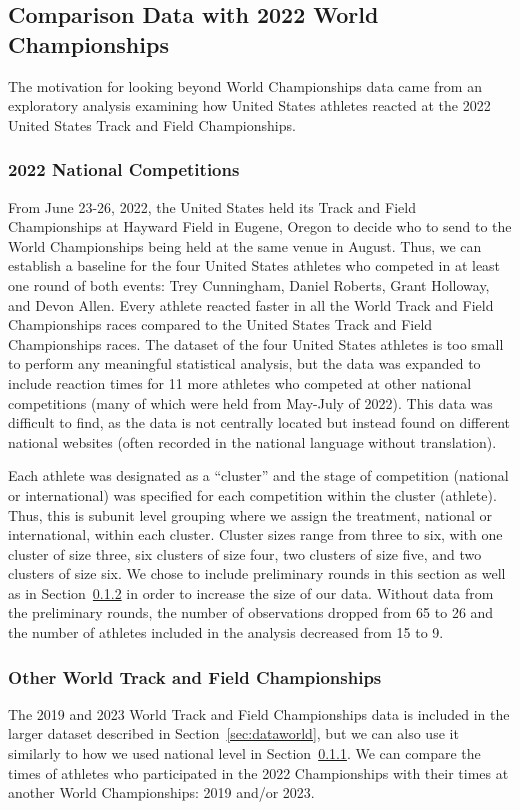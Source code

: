 \documentclass[12pt, letterpaper, titlepage]{article}
\begin{document}
\subsection{Comparison Data with 2022 World Championships}
\label{sec:databeyond}

The motivation for looking beyond World Championships data came from an 
exploratory analysis examining how United States athletes reacted at the 
2022 United States Track and Field Championships.


\subsubsection{2022 National Competitions}\label{sec:datanational}
From June 23-26, 2022, the United States held its Track and Field Championships 
at Hayward Field in Eugene, Oregon to decide who to send to the World 
Championships being held at the same venue in August. Thus, we can establish a 
baseline for the four United States athletes who competed in at least one round 
of both events: Trey Cunningham, Daniel Roberts, Grant Holloway, and Devon Allen.  
Every athlete reacted faster in all the World Track and Field Championships 
races compared to the United States Track and Field Championships races. The 
dataset of the four United States athletes is too small to perform any 
meaningful statistical analysis, but the data was expanded to include reaction 
times for 11 more athletes who competed at other national competitions (many of which were 
held from May-July of 2022). This data was difficult to find, as the data is not
centrally located but instead found on different national websites (often 
recorded in the national language without translation).


Each athlete was designated as a ``cluster'' and the stage of competition (national
or international) was specified for each competition within the cluster (athlete).
Thus, this is subunit level grouping where we assign the treatment, national or
international, within each cluster. Cluster sizes range from three to six, with
one cluster of size three, six clusters of size four, two clusters of size five,
and two clusters of size six. We chose to include preliminary rounds in this
section as well as in Section~\ref{sec:data2019} in order to increase the size 
of our data. Without data from the preliminary rounds, the number of observations
dropped from 65 to 26 and the number of athletes included in the analysis
decreased from 15 to 9.


\subsubsection{Other World Track and Field Championships}\label{sec:data2019}
The 2019 and 2023 World Track and Field Championships data is included in the 
larger dataset described in Section~\ref{sec:dataworld}, but we can also use it
similarly to how we used national level in Section~\ref{sec:datanational}. We
can compare the times of athletes who participated in the 2022 Championships with
their times at another World Championships: 2019 and/or 2023.
\end{document}
